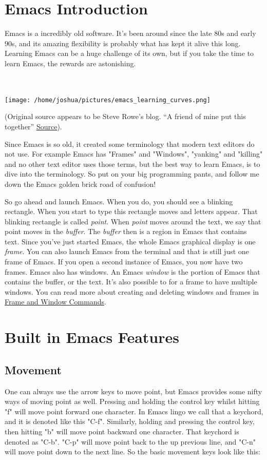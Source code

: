 \documentclass[11pt]{article}
\begin{document}
\section{Emacs Introduction}
\label{sec:orgheadline3}
Emacs is a incredibly old software.  It's been around since the late 80s and early 90s, and its amazing flexibility is probably what has kept it alive this long.  Learning Emacs can be a huge challenge of its own, but if you take the time to learn Emacs, the rewards are astonishing.

\\
\\

\texttt{[image: /home/joshua/pictures/emacs\_learning\_curves.png]}

(Original source appears to be Steve Rowe's blog. “A friend of mine put this together” \href{https://blogs.msdn.microsoft.com/steverowe/2004/11/17/code-editor-learning-curves/}{Source}).


Since Emacs is so old, it created some terminology that modern text editors do not use.  For example Emacs has "Frames" and "Windows", "yanking" and "killing" and no other text editor uses those terms, but the best way to learn Emacs, is to dive into the terminology.  So put on your big programming pants, and follow me down the Emacs golden brick road of confusion!

So go ahead and launch Emacs. When you do, you should see a blinking rectangle.  When you start to type this rectangle moves and letters appear.  That blinking rectangle is called \emph{point}.  When \emph{point} moves around the text, we say that point moves in the \emph{buffer}.  The \emph{buffer} then is a region in Emacs that contains text.  Since you've just started Emacs, the whole Emacs graphical display is one \emph{frame}.  You can also launch Emacs from the terminal and that is still just one frame of Emacs.  If you open a second instance of Emacs, you now have two frames.  Emacs also has windows.  An Emacs \emph{window} is the portion of Emacs that contains the buffer, or the text.  It's also possible to for a frame to have multiple windows.  You can read more about creating and deleting windows and frames in \hyperref[sec:orgheadline2]{Frame and Window Commands}.

\section{Built in Emacs Features}
\label{sec:orgheadline21}
\subsection{Movement}
\label{sec:orgheadline4}
One can always use the arrow keys to move point, but Emacs provides some nifty ways of moving point as well.  Pressing and holding the control key whilst hitting "f" will move point forward one character.  In Emacs lingo we call that a keychord, and it is denoted like this "C-f".  Similarly, holding and pressing the control key, then hitting "b" will move point backward one character.  That keychord is denoted as "C-b".  "C-p" will move point back to the up previous line, and "C-n" will move point down to the next line.  So the basic movement keys look like this:
\end{document}
